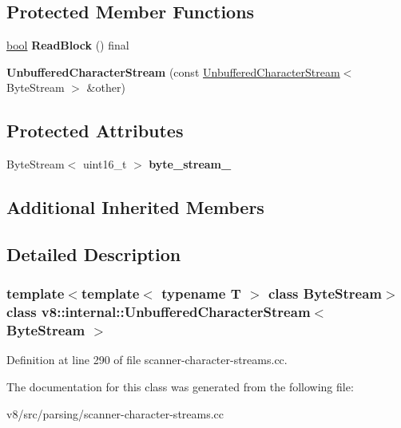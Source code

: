 \subsection*{Protected Member Functions}
\begin{DoxyCompactItemize}
\item 
\mbox{\label{classv8_1_1internal_1_1UnbufferedCharacterStream_acfb984477b9822a86080df65138526aa}} 
\mbox{\hyperlink{classbool}{bool}} {\bfseries Read\+Block} () final
\item 
\mbox{\label{classv8_1_1internal_1_1UnbufferedCharacterStream_ac162910175e99a9b09df609d06285acc}} 
{\bfseries Unbuffered\+Character\+Stream} (const \mbox{\hyperlink{classv8_1_1internal_1_1UnbufferedCharacterStream}{Unbuffered\+Character\+Stream}}$<$ Byte\+Stream $>$ \&other)
\end{DoxyCompactItemize}
\subsection*{Protected Attributes}
\begin{DoxyCompactItemize}
\item 
\mbox{\label{classv8_1_1internal_1_1UnbufferedCharacterStream_a22f6a85aafaa186be00ad4a7fb26618c}} 
Byte\+Stream$<$ uint16\+\_\+t $>$ {\bfseries byte\+\_\+stream\+\_\+}
\end{DoxyCompactItemize}
\subsection*{Additional Inherited Members}


\subsection{Detailed Description}
\subsubsection*{template$<$template$<$ typename T $>$ class Byte\+Stream$>$\newline
class v8\+::internal\+::\+Unbuffered\+Character\+Stream$<$ Byte\+Stream $>$}



Definition at line 290 of file scanner-\/character-\/streams.\+cc.



The documentation for this class was generated from the following file\+:\begin{DoxyCompactItemize}
\item 
v8/src/parsing/scanner-\/character-\/streams.\+cc\end{DoxyCompactItemize}
